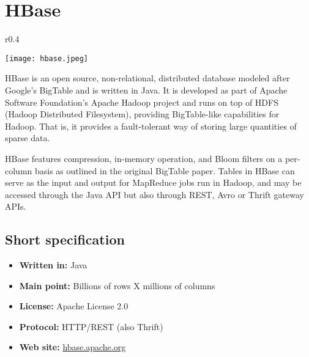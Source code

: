 \chapter{HBase}

\begin{wrapfigure}{r}{0.4\textwidth}
  \vspace{-42pt}
  \begin{center}
    \texttt{[image: hbase.jpeg]}
  \end{center}
  \vspace{110pt}
\end{wrapfigure}
HBase is an open source, non-relational, distributed database modeled after Google's BigTable and is written in Java. It is developed as part of Apache Software Foundation's Apache Hadoop project and runs on top of HDFS (Hadoop Distributed Filesystem), providing BigTable-like capabilities for Hadoop. That is, it provides a fault-tolerant way of storing large quantities of sparse data.

HBase features compression, in-memory operation, and Bloom filters on a per-column basis as outlined in the original BigTable paper. Tables in HBase can serve as the input and output for MapReduce jobs run in Hadoop, and may be accessed through the Java API but also through REST, Avro or Thrift gateway APIs.

\section{Short specification}

\begin{itemize}
  \item \textbf{Written in:} Java
  \item \textbf{Main point:} Billions of rows X millions of columns
  \item \textbf{License:} Apache License 2.0
  \item \textbf{Protocol:} HTTP/REST (also Thrift)
  \item \textbf{Web site:} \href{http://hbase.apache.org/}{hbase.apache.org}
\end{itemize}